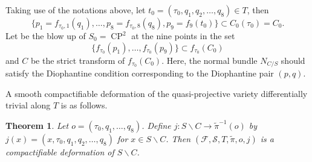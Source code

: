 \documentclass[pdftex]{sigma}
\numberwithin{equation}{section}
\newtheorem{Theorem}{Theorem}[section]
\begin{document}
Taking use of the notations above, let $t_0 = (\tau_0, q_1,q_2,\dots ,q_8) \in T$, then
\[\{ p_1=f_{\tau_0,1}(q_1),\dots ,p_8=f_{\tau_0,8}(q_8),p_9=f_9(t_0) \} \subset C_0(\tau_0)=C_0.\]
Let  be the blow up of $S_0 =\operatorname{CP}^2$ at the nine points in the set
\[ \{ f_{\tau_0}(p_1),\dots ,f_{\tau_0}(p_9) \}\subset f_{\tau_0}(C_0)\]
and $C$ be the strict transform of $f_{\tau_0}(C_0)$. Here, the normal bundle $N_{C/S}$ should satisfy the Diophantine condition corresponding to the Diophantine pair $(p,q)$.

A smooth compactifiable deformation of the quasi-projective variety  differentially trivial along $T$ is as follows.

\begin{Theorem} \label{Theorem3.13}
Let $o=(\tau_0,q_1,\dots ,q_8)$. Define $j\colon S \backslash C\rightarrow \widetilde{\pi}^{-1}(o)$ by $j(x)=(x,\tau_0, q_1,q_2,\dots ,q_8)$ for $x\in S\backslash C$. Then $(\mathcal{F},\mathcal{S},T,\widetilde{\pi},o,j)$ is a compactifiable deformation of $S\backslash C$.
\end{Theorem}
\end{document}
